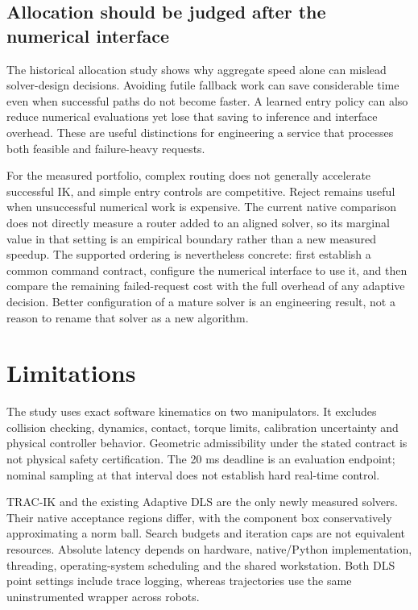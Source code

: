 \documentclass[10pt,a4paper]{article}
\begin{document}
\subsection{Allocation should be judged after the numerical interface}

The historical allocation study shows why aggregate speed alone can mislead
solver-design decisions. Avoiding futile fallback work can save considerable
time even when successful paths do not become faster. A learned entry policy
can also reduce numerical evaluations yet lose that saving to inference and
interface overhead. These are useful distinctions for engineering a service
that processes both feasible and failure-heavy requests.

For the measured portfolio, complex routing does not generally accelerate
successful IK, and simple entry controls are competitive. Reject remains useful
when unsuccessful numerical work is expensive. The current native comparison
does not directly measure a router added to an aligned solver, so its marginal
value in that setting is an empirical boundary rather than a new measured
speedup. The supported ordering is nevertheless concrete: first establish a
common command contract, configure the numerical interface to use it, and then
compare the remaining failed-request cost with the full overhead of any
adaptive decision. Better configuration of a mature solver is an engineering
result, not a reason to rename that solver as a new algorithm.

\section{Limitations}
\label{sec:limitations}

The study uses exact software kinematics on two manipulators. It excludes
collision checking, dynamics, contact, torque limits, calibration uncertainty
and physical controller behavior. Geometric admissibility under the stated
contract is not physical safety certification. The 20 ms deadline is an
evaluation endpoint; nominal sampling at that interval does not establish
hard real-time control.

TRAC-IK and the existing Adaptive DLS are the only newly measured solvers.
Their native acceptance regions differ, with the component box conservatively
approximating a norm ball. Search budgets and iteration caps are not equivalent
resources. Absolute latency depends on hardware, native/Python implementation,
threading, operating-system scheduling and the shared workstation.
Both DLS point settings include trace logging, whereas trajectories use the
same uninstrumented wrapper across robots.
\end{document}
